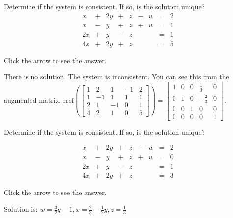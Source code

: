 \documentclass{ximera}
\begin{document}
\begin{problem}\label{prb:2.15}
Determine if the system is consistent. If so, is the solution unique?
$$\begin{array}{ccccccccc}
      x & +&2y&+&z&-&w&= &2 \\
	 x& -&y&+&z&+&w&=&1\\
     2x& +&y&-&z&&&=&1\\
     4x&+&2y&+&z&&&=&5
    \end{array}$$

Click the arrow to see the answer. 
\begin{expandable}
There is no solution. The system is inconsistent. You can see this from the
augmented matrix. $\mbox{rref}\left(\left[
\begin{array}{rrrr|r}
1 & 2 & 1 & -1 & 2 \\
1 & -1 & 1 & 1 & 1 \\
2 & 1 & -1 & 0 & 1 \\
4 & 2 & 1 & 0 & 5
\end{array}
\right]\right) = \left[
\begin{array}{rrrr|r}
1 & 0 & 0 &  \frac{1}{3} & 0 \\
0 & 1 & 0 & - \frac{2}{3} & 0 \\
0 & 0 & 1 & 0 & 0 \\
0 & 0 & 0 & 0 & 1
\end{array}
\right] .$
\end{expandable}
\end{problem}

\begin{problem}\label{prb:2.16}
Determine if the system is consistent. If so, is the solution unique?

$$\begin{array}{ccccccccc}
      x & +&2y&+&z&-&w&= &2 \\
	 x& -&y&+&z&+&w&=&0\\
     2x& +&y&-&z&&&=&1\\
     4x&+&2y&+&z&&&=&3
    \end{array}$$

Click the arrow to see the answer. 
\begin{expandable}
Solution is: $ w=\frac{3}{2}y-1, x=\frac{2}{3}-\frac{1}{2}y, z=\frac{1}{3} $
\end{expandable}
\end{problem}
\end{document}
